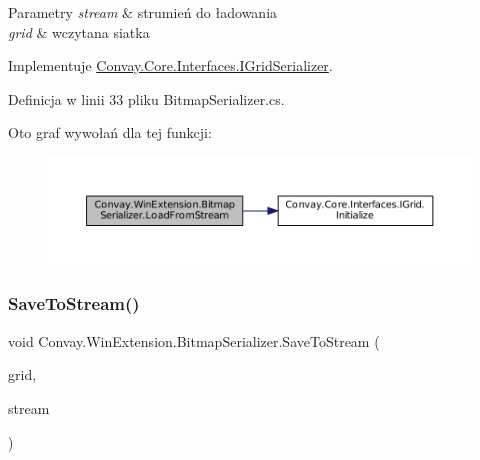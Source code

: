 \begin{DoxyParams}{Parametry}
{\em stream} & strumień do ładowania\\
\hline
{\em grid} & wczytana siatka\\
\hline
\end{DoxyParams}


Implementuje \hyperlink{interface_convay_1_1_core_1_1_interfaces_1_1_i_grid_serializer_ab6297bf5bb8f31e4ee4c27e4edfcd2bc}{Convay.\+Core.\+Interfaces.\+I\+Grid\+Serializer}.



Definicja w linii 33 pliku Bitmap\+Serializer.\+cs.

Oto graf wywołań dla tej funkcji\+:
\nopagebreak
\begin{figure}[H]
\begin{center}
\leavevmode
\includegraphics[width=350pt]{class_convay_1_1_win_extension_1_1_bitmap_serializer_ab92b6c14cd7febe69f9dbc03cb3f2e3b_cgraph}
\end{center}
\end{figure}
\hypertarget{class_convay_1_1_win_extension_1_1_bitmap_serializer_ac5d034f09f4bdeed5230507e3ad8d683}{}\label{class_convay_1_1_win_extension_1_1_bitmap_serializer_ac5d034f09f4bdeed5230507e3ad8d683} 
\subsubsection{\texorpdfstring{Save\+To\+Stream()}{SaveToStream()}}
{\footnotesize\ttfamily void Convay.\+Win\+Extension.\+Bitmap\+Serializer.\+Save\+To\+Stream (\begin{DoxyParamCaption}\item[{\hyperlink{interface_convay_1_1_core_1_1_interfaces_1_1_i_grid}{I\+Grid}}]{grid,  }\item[{Stream}]{stream }\end{DoxyParamCaption})}



